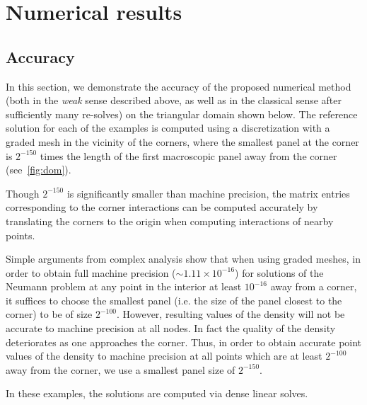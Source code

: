 
\section{Numerical results}
\subsection{Accuracy}
In this section, we demonstrate the accuracy of the proposed numerical method (both in the {\it weak} sense 
described above, 
as well as in the classical sense after sufficiently many re-solves) on the triangular domain shown below. 
The reference solution for each of the examples is computed using a discretization with
a graded mesh in the vicinity of the corners, where the smallest panel at the corner is $2^{-150}$ times
the length of the first macroscopic panel away from the corner (see~\cref{fig:dom}). 
\begin{rem}
Though $2^{-150}$ is significantly smaller than machine precision, the matrix entries corresponding to the
corner interactions can be computed accurately by translating the corners to the origin when 
computing interactions of nearby points.
\end{rem} 
\begin{rem}
Simple arguments from complex analysis show that when using graded meshes, in order to obtain full 
machine precision 
($\sim 1.11 \times 10^{-16}$) for solutions of the Neumann problem at any point in the interior 
at least $10^{-16}$ away from a corner, it suffices to choose the smallest panel (i.e. the size of the 
panel closest to the corner) to be of size $2^{-100}.$ However, resulting values of the density will not be 
accurate to machine precision at all nodes. In fact the quality
of the density deteriorates as one approaches the corner. Thus, in order to obtain accurate point values
of the density to machine precision at all points which are at least $2^{-100}$ away from the corner, we use a smallest
panel size of $2^{-150}$. 
\end{rem}
In these examples, the solutions are computed via dense linear solves.


